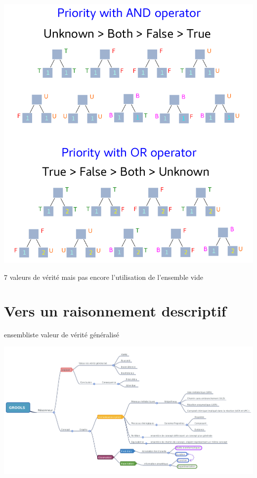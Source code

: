 \begin{refsegment}
\begin{shadedfigure}
    \centering
    \includegraphics[width=\textwidth]{img/four_values_priorities_rules.pdf}
    \caption{  }
    \label{fig:seven_truth_values}
\end{shadedfigure}



7 valeurs de vérité mais pas encore l'utilisation de l'ensemble vide


\section{Vers un raisonnement descriptif}
ensembliste valeur de vérité généralisé



\begin{shadedfigure}
    \centering
    \includegraphics[width=\textwidth]{img/GROOLS_mindmap.pdf}
    \caption{  }
    \label{fig:GROOLS_mindmap}
\end{shadedfigure}


\end{refsegment}
